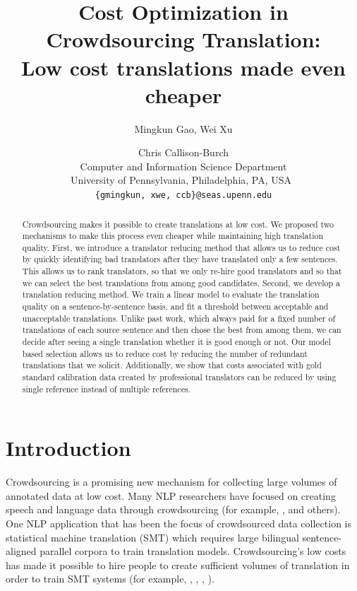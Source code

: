 \documentclass[11pt,letterpaper]{article}
\title{Cost Optimization in Crowdsourcing Translation:\\ Low cost translations made even cheaper}
\author{Mingkun Gao, Wei Xu \and Chris Callison-Burch\\
  Computer and Information Science Department\\
  University of Pennsylvania, Philadelphia, PA, USA\ \\
  {\tt \{gmingkun, xwe, ccb\}@seas.upenn.edu}
}
\date{}
\begin{document}
\maketitle
\begin{abstract}
Crowdsourcing makes it possible to create translations at low cost. We proposed two mechanisms to make this process even cheaper while maintaining high translation quality.
First, we introduce a translator reducing method that allows us to reduce cost by quickly identifying bad translators after they have translated only a few sentences.  This allows us to rank translators, so that we only re-hire good translators and so that we can select the best translations from among good candidates. Second, we develop a translation reducing method.  We train a linear model to evaluate the translation quality on a sentence-by-sentence basis, and fit a threshold between acceptable and unacceptable translations.   Unlike past work, which always paid for a fixed number of translations of each source sentence and then chose the best from among them, we can decide after seeing a single translation whether it is good enough or not. Our model based selection allows us to reduce cost by reducing the number of redundant translations that we solicit. 
Additionally, we show that costs associated with gold standard calibration data created by professional translators can be reduced by using single reference instead of multiple references. 
 \end{abstract}

\section{Introduction}

Crowdsourcing is a promising new mechanism for collecting large volumes of annotated data at low cost.  %
Many NLP researchers have focused on creating speech and language data through crowdsourcing (for example,  ,  and others).  One NLP application that has been the focus of crowdsourced data collection is statistical machine translation (SMT) which requires large bilingual sentence-aligned parallel corpora to train translation models.  Crowdsourcing's low costs has made it possible to hire people to create sufficient volumes of translation in order to train SMT systems (for example,   ,  ,  , ).
\end{document}
